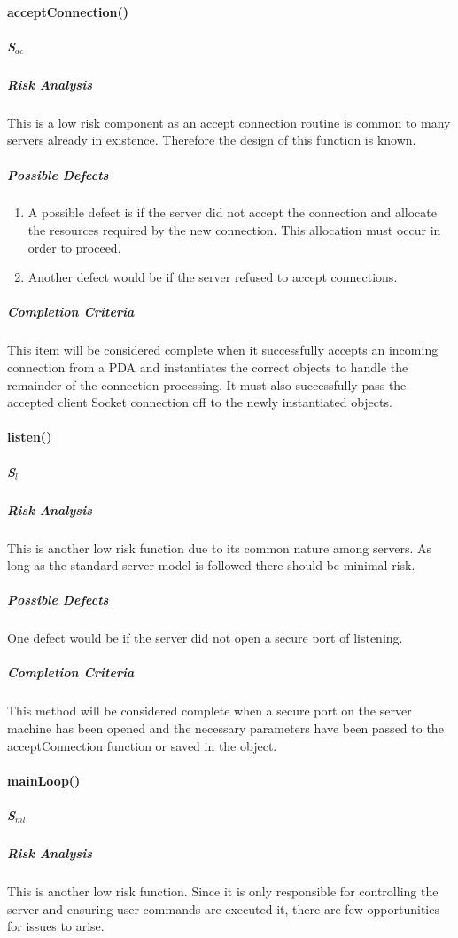 \documentclass{article}
\begin{document}
\paragraph{acceptConnection()}
\subparagraph{S$_{ac}$}

\subparagraph{Risk Analysis}
This is a low risk component as an accept connection routine is common to many servers already in existence. Therefore the design of this function is known.

\subparagraph{Possible Defects}
\begin{enumerate}
\item A possible defect is if the server did not accept the connection and allocate the resources required by the new connection. This allocation must occur in order to proceed.
\item Another defect would be if the server refused to accept connections.
\end{enumerate}

\subparagraph{Completion Criteria}
This item will be considered complete when it successfully accepts an incoming connection from a PDA and instantiates the correct objects to handle the remainder of the connection processing.  It must also successfully pass the accepted client Socket connection off to the newly instantiated objects.

\paragraph{listen()}
\subparagraph{S$_{l}$}

\subparagraph{Risk Analysis}
This is another low risk function due to its common nature among servers. As long as the standard server model is followed there should be minimal risk.

\subparagraph{Possible Defects}
One defect would be if the server did not open a secure port of listening. 

\subparagraph{Completion Criteria}
This method will be considered complete when a secure port on the server machine has been opened and the necessary parameters have been passed to the acceptConnection function or saved in the object.

\paragraph{mainLoop()}
\subparagraph{S$_{ml}$}

\subparagraph{Risk Analysis}
This is another low risk function.  Since it is only responsible for controlling the server and ensuring user commands are executed it, there are few opportunities for issues to arise.
\end{document}
